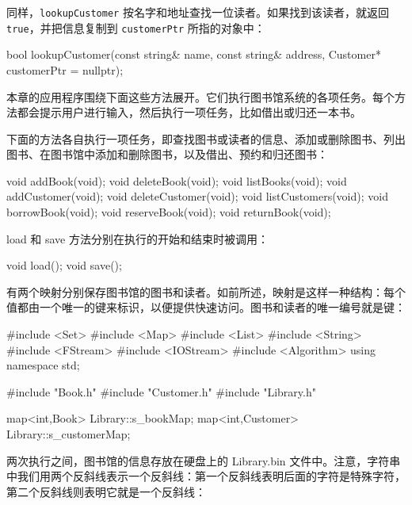 同样，\texttt{lookupCustomer} 按名字和地址查找一位读者。如果找到该读者，就返回 \texttt{true}，并把信息复制到 \texttt{customerPtr} 所指的对象中：

\begin{codebox}
    bool lookupCustomer(const string& name, const string& address,
                        Customer* customerPtr = nullptr);
\end{codebox}

本章的应用程序围绕下面这些方法展开。它们执行图书馆系统的各项任务。每个方法都会提示用户进行输入，然后执行一项任务，比如借出或归还一本书。

下面的方法各自执行一项任务，即查找图书或读者的信息、添加或删除图书、列出图书、在图书馆中添加和删除图书，以及借出、预约和归还图书：

\begin{codebox}
    void addBook(void);
    void deleteBook(void);
    void listBooks(void);
    void addCustomer(void);
    void deleteCustomer(void);
    void listCustomers(void);
    void borrowBook(void);
    void reserveBook(void);
    void returnBook(void);
\end{codebox}

load 和 save 方法分别在执行的开始和结束时被调用：

\begin{codebox}
    void load();
    void save();
\end{codebox}

有两个映射分别保存图书馆的图书和读者。如前所述，映射是这样一种结构：每个值都由一个唯一的键来标识，以便提供快速访问。图书和读者的唯一编号就是键：

\begin{codebox}
  public:
    static map<int,Book> s_bookMap;
    static map<int,Customer> s_customerMap;
};
\end{codebox}

\medskip{}

\begin{codebox}
#include <Set>
#include <Map>
#include <List>
#include <String>
#include <FStream>
#include <IOStream>
#include <Algorithm>
using namespace std;

#include "Book.h"
#include "Customer.h"
#include "Library.h"

map<int,Book> Library::s_bookMap;
map<int,Customer> Library::s_customerMap;
\end{codebox}

两次执行之间，图书馆的信息存放在硬盘上的 Library.bin 文件中。注意，字符串中我们用两个反斜线表示一个反斜线：第一个反斜线表明后面的字符是特殊字符，第二个反斜线则表明它就是一个反斜线：

